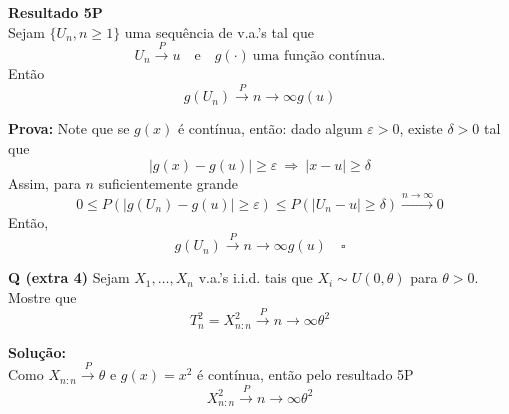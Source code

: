 \textbf{Resultado 5P} \\
Sejam $\{U_n, n \geq 1\}$ uma sequência de v.a.'s tal que
\begin{equation}
    U_n \xrightarrow{P} u \quad \text{e} \quad g(\cdot) \ \text{uma função contínua}.
\end{equation}
Então
\begin{equation}
    g(U_n) \xrightarrow{P}{n \to \infty} g(u)
\end{equation}

\textbf{Prova:} Note que se $g(x)$ é contínua, então: dado algum $\varepsilon > 0$, existe $\delta > 0$ tal que
\begin{equation}
    |g(x) - g(u)| \geq \varepsilon \ \Rightarrow \ |x - u| \geq \delta
\end{equation}
Assim, para $n$ suficientemente grande
\begin{equation}
    0 \leq P\left( |g(U_n) - g(u)| \geq \varepsilon \right) \leq P\left( |U_n - u| \geq \delta \right) \xrightarrow{n \to \infty} 0
\end{equation}
Então,
\begin{equation}
    g(U_n) \xrightarrow{P}{n \to \infty} g(u) \quad \square
\end{equation}

\textbf{Q (extra 4)} Sejam $X_1, \ldots, X_n$ v.a.'s i.i.d. tais que $X_i \sim U(0, \theta)$ para $\theta > 0$. \\
Mostre que
\begin{equation}
    T_n^2 = X_{n:n}^2 \xrightarrow{P}{n \to \infty} \theta^2
\end{equation}

\textbf{Solução:} \\
Como $X_{n:n} \xrightarrow{P} \theta$ e $g(x) = x^2$ é contínua, então pelo resultado 5P
\begin{equation}
    X_{n:n}^2 \xrightarrow{P}{n \to \infty} \theta^2
\end{equation}